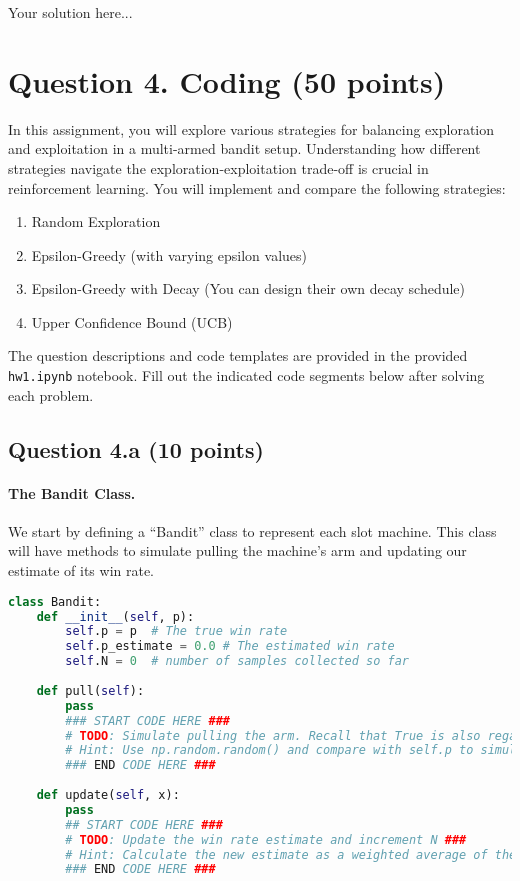 \documentclass[12pt]{article}
\begin{document}
\begin{solution}
    Your solution here...
\end{solution}

\section*{Question 4. Coding (50 points) }
In this assignment, you will explore various strategies for balancing exploration and exploitation in a multi-armed bandit setup. Understanding how different strategies navigate the exploration-exploitation trade-off is crucial in reinforcement learning. You will implement and compare the following strategies:
\begin{enumerate}
    \item Random Exploration
    \item Epsilon-Greedy (with varying epsilon values)
    \item Epsilon-Greedy with Decay (You can design their own decay schedule)
    \item Upper Confidence Bound (UCB)
\end{enumerate}
The question descriptions and code templates are provided in the provided \texttt{hw1.ipynb} notebook. Fill out the indicated code segments below after solving 
each problem.

\subsection*{Question 4.a (10 points) } 
\paragraph{The Bandit Class.} We start by defining a ``Bandit'' class to represent each slot machine. This class will have methods to simulate pulling the machine's arm and updating our estimate of its win rate.

\begin{solution}
\begin{lstlisting}[language=Python]
class Bandit:
    def __init__(self, p):
        self.p = p  # The true win rate
        self.p_estimate = 0.0 # The estimated win rate
        self.N = 0  # number of samples collected so far
    
    def pull(self):
        pass
        ### START CODE HERE ###
        # TODO: Simulate pulling the arm. Recall that True is also regarded as 1 and False is regarded as 0 ###
        # Hint: Use np.random.random() and compare with self.p to simulate a dense probability distribution
        ### END CODE HERE ###
    
    def update(self, x):
        pass
        ## START CODE HERE ###
        # TODO: Update the win rate estimate and increment N ###
        # Hint: Calculate the new estimate as a weighted average of the old estimate and the new sample `x`
        ### END CODE HERE ###
\end{lstlisting}
\end{solution}
\end{document}
